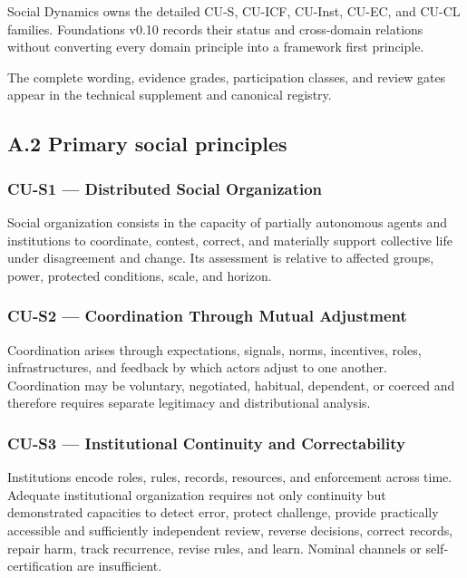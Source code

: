 \documentclass[
  11pt,
]{article}
\begin{document}
Social Dynamics owns the detailed CU-S, CU-ICF, CU-Inst, CU-EC, and
CU-CL families. Foundations v0.10 records their status and cross-domain
relations without converting every domain principle into a framework
first principle.

The complete wording, evidence grades, participation classes, and review
gates appear in the technical supplement and canonical registry.

\subsection{A.2 Primary social
principles}\label{a.2-primary-social-principles}

\subsubsection{CU-S1 --- Distributed Social
Organization}\label{cu-s1-distributed-social-organization-1}

Social organization consists in the capacity of partially autonomous
agents and institutions to coordinate, contest, correct, and materially
support collective life under disagreement and change. Its assessment is
relative to affected groups, power, protected conditions, scale, and
horizon.

\subsubsection{CU-S2 --- Coordination Through Mutual
Adjustment}\label{cu-s2-coordination-through-mutual-adjustment-1}

Coordination arises through expectations, signals, norms, incentives,
roles, infrastructures, and feedback by which actors adjust to one
another. Coordination may be voluntary, negotiated, habitual, dependent,
or coerced and therefore requires separate legitimacy and distributional
analysis.

\subsubsection{CU-S3 --- Institutional Continuity and
Correctability}\label{cu-s3-institutional-continuity-and-correctability-1}

Institutions encode roles, rules, records, resources, and enforcement
across time. Adequate institutional organization requires not only
continuity but demonstrated capacities to detect error, protect
challenge, provide practically accessible and sufficiently independent
review, reverse decisions, correct records, repair harm, track
recurrence, revise rules, and learn. Nominal channels or
self-certification are insufficient.
\end{document}
